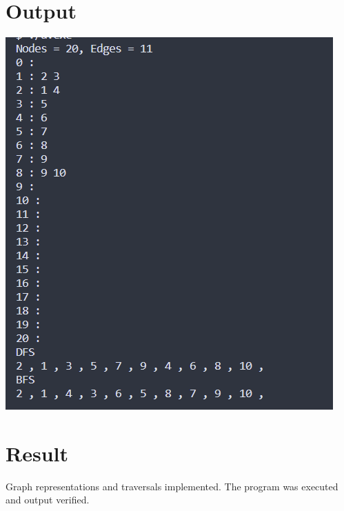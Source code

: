 \section{Output}
\includegraphics[]{Cycle_2/Outputs/GraphAdjMatrix.png}

\section{Result}
Graph representations and traversals implemented. The program was executed and output
verified.